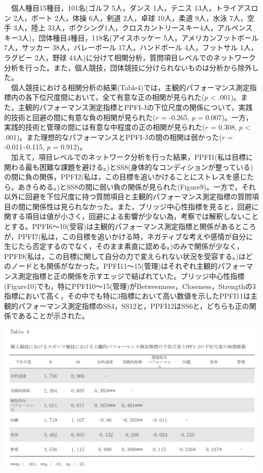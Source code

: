 \documentclass[12pt,a4paper,xelatex,ja=standard]{bxjsarticle}
\begin{document}
　個人種目15種目，101名(ゴルフ 5人，ダンス 1人，テニス
13人，トライアスロン 2人，ボート 2人，体操 6人，剣道 2人，卓球
10人，柔道 9人，水泳 7人，空手 3人，陸上
33人，ボクシング1人，クロスカントリースキー4人，アルペンスキー3人)，団体種目4種目，118名(アイスホッケー
5人，アメリカンフットボール 7人，サッカー 38人，バレーボール
17人，ハンドボール 4人，フットサル 1人，ラグビー 2人，野球
44人)に分けて相関分析，質問項目レベルでのネットワーク分析を行った。また，個人競技，団体競技に分けられないものは分析から除外した。\\
　個人競技における相関分析の結果(Table4)では，主観的パフォーマンス測定指標内の各下位尺度間において，全て有意な正の相関が見られた(\(\mathit{p}\)
\textless{}
.001)。また，主観的パフォーマンス測定指標とPPFI-Jの下位尺度の関係について，実践的技術と回避の間に有意な負の相関が見られた(\(\mathit{r}\)
= -0.265, \(\mathit{p}\) =
0.007)。一方，実践的技術と管理の間には有意な中程度の正の相関が見られた(\(\mathit{r}\)
= 0.308, \(\mathit{p}\) \textless{}
.001)。また理想的なパフォーマンスとPPFI-Jの間の相関は弱かった(\(\mathit{r}\)
= -0.011\textasciitilde0.115, \(\mathit{p}\) = 0.912)。\\
　加えて，項目レベルでのネットワーク分析を行った結果，PPFI1(私は目標に関わる最も困難な課題を避ける。)とSS8(身体的なコンディションが整っている)の間に負の関係，PPFI2(私は，この目標を追いかけることにストレスを感じたら，あきらめる。)とSS8の間に弱い負の関係が見られた(Figure9)。一方で，それ以外に回避を下位尺度に持つ質問項目と主観的パフォーマンス測定指標の質問項目の間に関係性は見られなかった。また，ブリッジ中心性指標を見ると，回避に関する項目は値が小さく，回避による影響が少ない為，考察では解釈しないこととする。PPFI6～10(受容)は主観的パフォーマンス測定指標と関係があるところが，PPFI7(私は，この目標を追いかける時，ネガティブな考えや感情が自分に生じたら否定するのでなく，そのまま素直に認める。)のみで関係が少なく，PPFI9(私は，この目標に関して自分の力で変えられない状況を受容する。)はどのノードとも関係がなかった。PPFI11～15(管理)はそれぞれ主観的パフォーマンス測定指標と正の関係を示すエッジで結ばれていた。ブリッジ中心性指標(Figure10)でも，特にPPFI10～15(管理)がBetweenness，Closeness，Strengthの3指標において高く，その中でも特に3指標において高い数値を示したPPFI11は主観的パフォーマンス測定指標のSS4，SS12と，PPFI12はSS6と，どちらも正の関係であることが示された。
　 　 　

\includegraphics{figure/table4.png}
\end{document}
